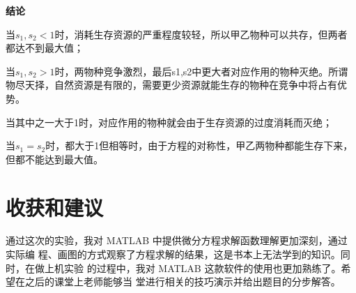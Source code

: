 \documentclass{article}
\begin{document}
\textbf{结论}

当$s_1,s_2<1$时，消耗生存资源的严重程度较轻，所以甲乙物种可以共存，但两者都达不到最大值；

当$s_1,s_2>1$时，两物种竞争激烈，最后s1,s2中更大者对应作用的物种灭绝。所谓物尽天择，自然资源是有限的，需要更少资源就能生存的物种在竞争中将占有优势。

当其中之一大于1时，对应作用的物种就会由于生存资源的过度消耗而灭绝；

当$s_1=s_2$时，都大于1但相等时，由于方程的对称性，甲乙两物种都能生存下来，但都不能达到最大值。


\newpage
\section{收获和建议}
通过这次的实验，我对 MATLAB 中提供微分方程求解函数理解更加深刻，通过实际编 程、画图的方式观察了方程求解的结果，这是书本上无法学到的知识。同时，在做上机实验 的过程中，我对 MATLAB 这款软件的使用也更加熟练了。希望在之后的课堂上老师能够当 堂进行相关的技巧演示并给出题目的分步解答。
\end{document}
